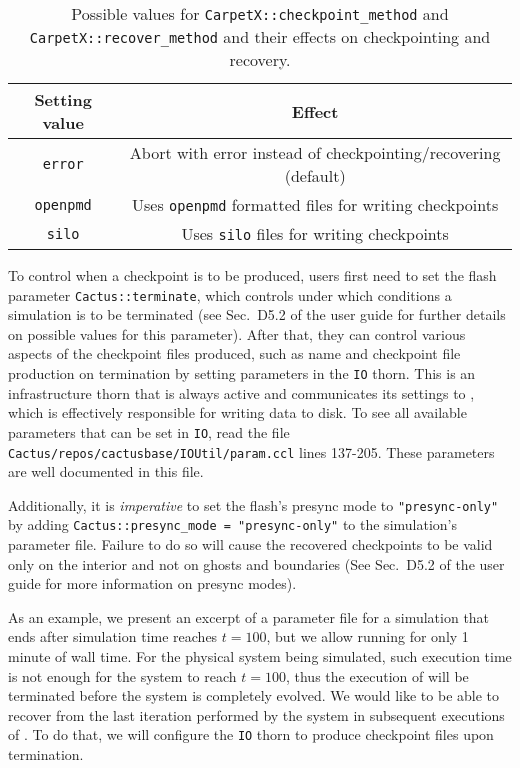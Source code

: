 \begin{table}[hb]
  \centering
  \begin{tabular}{cc}
  Setting value    & Effect                                                         \\ \hline\hline
  \texttt{error}   & Abort with error instead of checkpointing/recovering (default) \\
  \texttt{openpmd} & Uses \texttt{openpmd} formatted files for writing checkpoints  \\
  \texttt{silo}    & Uses \texttt{silo} files for writing checkpoints               \\ \hline\hline
  \end{tabular}
  \caption{Possible values for \texttt{CarpetX::checkpoint\_method} and \texttt{CarpetX::recover\_method} and their effects on checkpointing and recovery.}
  \label{tab:checkpoint_recovery}
\end{table}


To control when a checkpoint is to be produced, users first need to set the flash parameter \texttt{Cactus::terminate}, which controls under which conditions a simulation is to be terminated (see Sec.~D5.2 of the \Cactus\space user guide for further details on possible values for this parameter). After that, they can control various aspects of the checkpoint files produced, such as name and checkpoint file production on termination by setting parameters in the \texttt{IO} thorn. This is an infrastructure thorn that is always active and communicates its settings to \CarpetX, which is effectively responsible for writing data to disk. To see all available parameters that can be set in \texttt{IO}, read the file \texttt{Cactus/repos/cactusbase/IOUtil/param.ccl} lines 137-205. These parameters are well documented in this file. 

Additionally, it is \textit{imperative} to set the flash's presync mode to \texttt{"presync-only"} by adding \texttt{Cactus::presync\_mode = "presync-only"} to the simulation's parameter file. Failure to do so will cause the recovered checkpoints to be valid only on the interior and not on ghosts and boundaries (See Sec.~D5.2 of the \Cactus\space user guide for more information on presync modes).

As an example, we present an excerpt of a parameter file for a simulation that ends after simulation time reaches $t=100$, but we allow \Cactus\space running for only 1 minute of wall time. For the physical system being simulated, such execution time is not enough for the system to reach $t=100$, thus the execution of \Cactus\space will be terminated before the system is completely evolved. We would like to be able to recover from the last iteration performed by the system in subsequent executions of \Cactus. To do that, we will configure the \texttt{IO} thorn to produce checkpoint files upon \Cactus\space termination.

